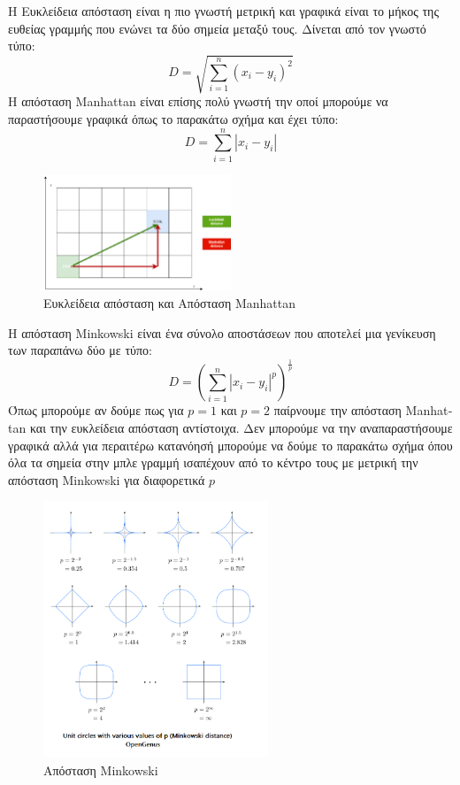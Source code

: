 Η Ευκλείδεια απόσταση είναι η πιο γνωστή μετρική και γραφικά είναι το μήκος της ευθείας γραμμής
που ενώνει τα δύο σημεία μεταξύ τους. Δίνεται από τον γνωστό τύπο:
$$D=\sqrt{\sum\limits_{i=1}^{n}(x_i-y_i)^2}$$
Η απόσταση \textlatin{Manhattan} είναι επίσης πολύ γνωστή την οποί μπορούμε να
παραστήσουμε γραφικά όπως το παρακάτω σχήμα και έχει τύπο:
$$D=\sum\limits_{i=1}^{n}\left\lvert x_i-y_i\right\rvert$$
\begin{figure}[H]
    \centering
    \includegraphics[width=0.5\textwidth]{images/manhattanDistance.png}
    \caption{Ευκλείδεια απόσταση και Απόσταση \textlatin{Manhattan}}
\end{figure}
Η απόσταση \textlatin{Minkowski} είναι ένα σύνολο αποστάσεων που αποτελεί μια γενίκευση των
παραπάνω δύο με τύπο:
$$D=\left(\sum\limits_{i=1}^{n}\left\lvert x_i-y_i\right\rvert^p\right)^{\frac{1}{p}}$$
Όπως μπορούμε αν δούμε πως για $p=1$ και $p=2$ παίρνουμε την απόσταση \textlatin{Manhattan} και
την ευκλείδεια απόσταση αντίστοιχα. Δεν μπορούμε να την αναπαραστήσουμε γραφικά αλλά για περαιτέρω
κατανόησή μπορούμε να δούμε το παρακάτω σχήμα όπου όλα τα σημεία στην μπλε γραμμή ισαπέχουν από το
κέντρο τους με μετρική την απόσταση \textlatin{Minkowski} για διαφορετικά $p$
\begin{figure}[H]
    \centering
    \includegraphics[width=0.6\textwidth]{images/minkowskiDistance.png}
    \caption{Απόσταση \textlatin{Minkowski}}
\end{figure}

